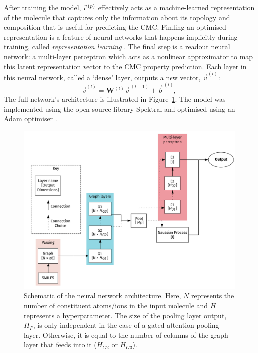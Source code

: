 After training the model, $\vec{v}^{\,(p)}{}$ effectively acts as a machine-learned representation of the molecule that captures only the information about its topology and composition that is useful for predicting the CMC. Finding an optimised representation is a feature of neural networks that happens implicitly during training, called \emph{representation learning} \cite{goodfellowRepresentationLearning2016}.
The final step is a readout neural network: a multi-layer perceptron which acts as a nonlinear approximator to map this
latent representation vector to the CMC property prediction. Each layer in this neural network, called a `dense' layer, outputs a new vector, $\vec{v}^{(l)}$:
\begin{equation}
    \vec{v}^{(l)} = \mathbf{W}^{(l)}\vec{v}^{\,(l-1)} + \vec{b}^{\,(l)},
\end{equation}
The full network's architecture is illustrated in Figure~\ref{fig:model-topology}. The model was implemented using the open-source library Spektral\cite{grattarolaGraphNeuralNetworks2020} and optimised using an Adam optimiser \cite{kingmaAdamMethodStochastic2017}.

\begin{figure}
    \centering
    \includegraphics[width=\textwidth]{images/model_graph.pdf}
    \caption{Schematic of the neural network architecture. Here, $N$ represents
        the number of constituent atoms/ions in the input molecule and $H$
        represents a hyperparameter. The size of the pooling layer output, $H_P$, is
        only independent in the case of a gated attention-pooling layer. Otherwise,
        it is equal to the number of columns of the graph layer that feeds into it
        ($H_{G2}$ or $H_{G3}$).}
    \label{fig:model-topology}
\end{figure}

